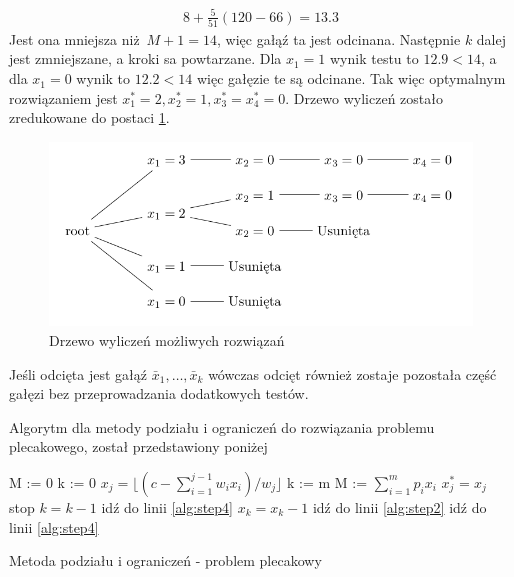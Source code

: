 \begin{equation*}
  \begin{aligned}
    8+\frac{5}{51}(120-66) = 13.3
  \end{aligned}
\end{equation*}
Jest ona mniejsza niż $M+1 =14$, więc gałąź ta jest odcinana. Następnie $k$ dalej jest zmniejszane, a kroki sa powtarzane. Dla $x_1=1$ wynik testu to $12.9 < 14$, a dla $x_1=0$ wynik to $12.2 < 14$ więc gałęzie te są odcinane. Tak więc optymalnym rozwiązaniem jest  $x_1^* = 2, x_2^*=1, x_3^*=x_4^*=0$. Drzewo wyliczeń zostało zredukowane do postaci \ref{fig:reducedchvatalBBtree}.

\begin{figure}
  \includegraphics[width=\textwidth,center]{../image/reduced_chvatal_book_sample.png}%
  \caption{Drzewo wyliczeń możliwych rozwiązań}
  \label{fig:reducedchvatalBBtree}
\end{figure}

Jeśli odcięta jest gałąź $\bar{x}_1, \dots, \bar{x}_k$ wówczas odcięt również zostaje pozostała część gałęzi bez przeprowadzania dodatkowych testów.

Algorytm dla metody podziału i ograniczeń do rozwiązania problemu plecakowego, został przedstawiony poniżej

\begin{algorithm}
  \begin{algorithmic}[1]
    \State M := 0
    \State k := 0
     \label{alg:step2}
      \State $ x_j = \lfloor{(c - \sum_{i=1}^{j-1}w_ix_i)/w_j}\rfloor$
    \EndFor
    \State k := m
      \State M := $\sum_{i=1}^m p_ix_i$
        \State $x_j^* = x_j$
      \EndFor
    \EndIf
     \label{alg:step4}
      \State stop
    \Else
      \State $k=k-1$
    \EndIf
      \State idź do linii \ref{alg:step4}
    \Else
      \State $x_k = x_k - 1$
    \EndIf
      \State idź do linii \ref{alg:step2}
    \Else
      \State idź do linii \ref{alg:step4}
    \EndIf
  \end{algorithmic}
    \caption{Metoda podziału i ograniczeń - problem plecakowy}
\end{algorithm}

